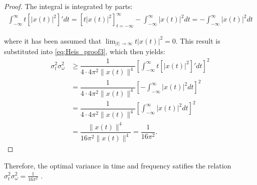 \begin{proof}
The integral is integrated by parts:
\begin{align*}
\int_{-\infty}^\infty t \left[ |x(t)|^2 \right]' dt = \left[ t |x(t)|^2 \right]_{t=-\infty}^\infty - \int_{-\infty}^\infty |x(t)|^2 dt = - \int_{-\infty}^\infty |x(t)|^2 dt
\end{align*}

where it has been assumed that $\lim_{|t| \to \infty} t |x(t)|^2 = 0$. This result is substituted into \eqref{eq:Heis_proof3}, which then yields:
\begin{align*}
\sigma_t^2 \sigma_\omega^2 &\geq \dfrac{1}{4 \cdot 4\pi^2 \|x(t)\|^4} \left[ \int_{-\infty}^\infty t \left[ |x(t)|^2 \right]' dt \right]^2 \\
&= \dfrac{1}{4 \cdot 4\pi^2 \|x(t)\|^4} \left[ - \int_{-\infty}^\infty |x(t)|^2 dt \right]^2 \\
&= \dfrac{1}{4 \cdot 4\pi^2 \|x(t)\|^4} \left[ \int_{-\infty}^\infty |x(t)|^2 dt \right]^2 \\
&= \dfrac{\|x(t)\|^4}{16\pi^2 \|x(t)\|^4} = \dfrac{1}{16\pi^2}.
\end{align*}
\end{proof}

Therefore, the optimal variance in time and frequency satifies the relation $\sigma_t^2\sigma_\omega^2 = \frac{1}{16\pi^2}$ .